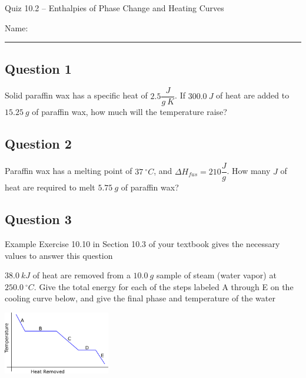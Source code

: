 \documentclass[11pt, letterpaper]{memoir}
\begin{document}
	\begin{center}
		{\large	Quiz 10.2 -- Enthalpies of Phase Change and Heating Curves}
	\end{center}
	{\large Name: \rule[-1mm]{4in}{.1pt} 
		
	\subsection*{Question 1}
	Solid paraffin wax has a specific heat of $2.5\dfrac{J}{g~K}$. If $300.0~J$ of heat are added to $15.25~g$ of paraffin wax, how much will the temperature raise?
	
	\vspace{4.5em}
	\subsection*{Question 2}
	Paraffin wax has a melting point of $37~^\circ C$, and $\Delta H_{fus}=210\dfrac{J}{g}$. How many $J$ of heat are required to melt $5.75~g$ of paraffin wax?
	
	\vspace{4.5em}
	\subsection*{Question 3}
	Example Exercise 10.10 in Section 10.3 of your textbook gives the necessary values to answer this question
	
	\noindent $38.0~kJ$ of heat are removed from a $10.0~g$ sample of steam (water vapor) at $250.0~^\circ C$. Give the total energy for each of the steps labeled A through E on the cooling curve below, and give the final phase and temperature of the water
	
	
	
	\vspace{12em} 
	\hspace{-3em}\includegraphics[width=0.35\textwidth]{Cooling_Curve}
	
	\newpage
	\pagestyle{empty}
	\addtocounter{page}{-1}
}
\end{document}
